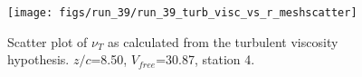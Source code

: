 \begin{figure}[H]
\centering
\texttt{[image: figs/run\_39/run\_39\_turb\_visc\_vs\_r\_meshscatter]}
\caption{Scatter plot of $\nu_T$ as calculated from the turbulent viscosity hypothesis. $z/c$=8.50, $V_{free}$=30.87, station 4.}
\label{fig:run_39_turb_visc_vs_r_meshscatter}
\end{figure}


